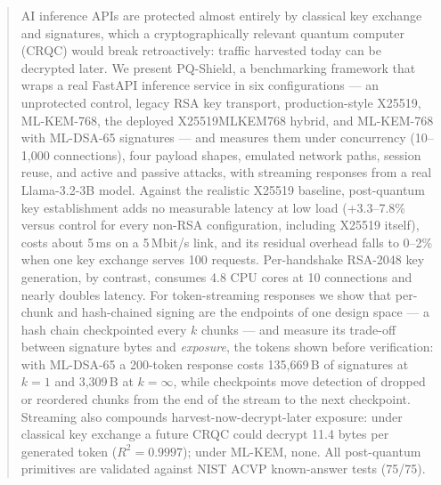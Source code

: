 
\begin{abstract}
AI inference APIs are protected almost entirely by classical key exchange and signatures, which a
cryptographically relevant quantum computer (CRQC) would break retroactively: traffic harvested
today can be decrypted later. We present PQ-Shield, a benchmarking framework that wraps a real
FastAPI inference service in six configurations --- an unprotected control, legacy RSA key transport,
production-style X25519, ML-KEM-768, the deployed X25519MLKEM768 hybrid, and ML-KEM-768 with
ML-DSA-65 signatures --- and measures them under concurrency (10--1,000 connections), four payload
shapes, emulated network paths, session reuse, and active and passive attacks, with streaming
responses from a real Llama-3.2-3B model. Against the realistic X25519 baseline, post-quantum key
establishment adds no measurable latency at low load (+3.3--7.8\% versus control for every
non-RSA configuration, including X25519 itself), costs about 5\,ms on a 5\,Mbit/s link, and its
residual overhead falls to 0--2\% when one key exchange serves 100 requests. Per-handshake RSA-2048 key
generation, by contrast, consumes 4.8 CPU cores at 10 connections and nearly doubles latency. For
token-streaming responses we show that per-chunk and hash-chained signing are the endpoints of one
design space --- a hash chain checkpointed every $k$ chunks --- and measure its trade-off between
signature bytes and \emph{exposure}, the tokens shown before verification: with ML-DSA-65 a 200-token
response costs 135,669\,B of signatures at $k{=}1$ and 3,309\,B at $k{=}\infty$, while checkpoints
move detection of dropped or reordered chunks from the end of the stream to the next checkpoint.
Streaming also compounds harvest-now-decrypt-later exposure: under classical key exchange a future
CRQC could decrypt 11.4 bytes per generated token ($R^2{=}0.9997$); under ML-KEM, none. All
post-quantum primitives are validated against NIST ACVP known-answer tests (75/75).
\end{abstract}

